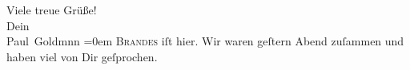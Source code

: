 \begin{ledgroupsized}[t]{13cm}
           \pstart
           Viele treue Grüße! {\\[\baselineskip]}Dein {\\[\baselineskip]}\spacefill\mbox{Paul Goldmnn}\pend
           \leftskip=0em{}\pstart
           \noindent{}\textsc{Brandes} iſt hier. Wir waren
                     geſtern{ }Abend zuſammen und haben viel von Dir geſprochen.\pend
           
         
         \endnumbering{}\end{ledgroupsized}\begin{anhang}\end{anhang}\newcommand{\dateiname}{L02927}\newcommand{\titel}{Paul Goldmann an Arthur Schnitzler, 7. 8. [1900]}\newcommand{\editorInnen}{Martin Anton Müller und Laura Untner}
      